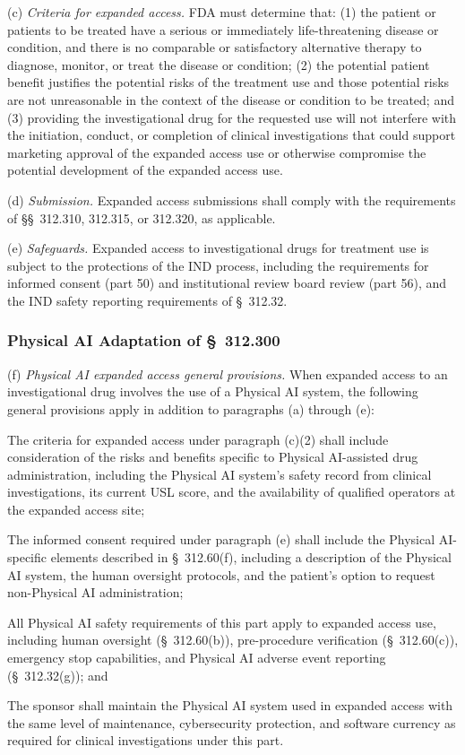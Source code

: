 (c) \textit{Criteria for expanded access.} FDA must determine that: (1) the patient or patients to be treated have a serious or immediately life-threatening disease or condition, and there is no comparable or satisfactory alternative therapy to diagnose, monitor, or treat the disease or condition; (2) the potential patient benefit justifies the potential risks of the treatment use and those potential risks are not unreasonable in the context of the disease or condition to be treated; and (3) providing the investigational drug for the requested use will not interfere with the initiation, conduct, or completion of clinical investigations that could support marketing approval of the expanded access use or otherwise compromise the potential development of the expanded access use.

(d) \textit{Submission.} Expanded access submissions shall comply with the requirements of \S\S~312.310, 312.315, or 312.320, as applicable.

(e) \textit{Safeguards.} Expanded access to investigational drugs for treatment use is subject to the protections of the IND process, including the requirements for informed consent (part 50) and institutional review board review (part 56), and the IND safety reporting requirements of \S~312.32.

\subsubsection{Physical AI Adaptation of \S~312.300}

(f) \textit{Physical AI expanded access general provisions.} When expanded access to an investigational drug involves the use of a Physical AI system, the following general provisions apply in addition to paragraphs (a) through (e):

\begin{description}[leftmargin=0.8cm,style=sameline]
\item[(i)] The criteria for expanded access under paragraph (c)(2) shall include consideration of the risks and benefits specific to Physical AI-assisted drug administration, including the Physical AI system's safety record from clinical investigations, its current USL score, and the availability of qualified operators at the expanded access site;
\item[(ii)] The informed consent required under paragraph (e) shall include the Physical AI-specific elements described in \S~312.60(f), including a description of the Physical AI system, the human oversight protocols, and the patient's option to request non-Physical AI administration;
\item[(iii)] All Physical AI safety requirements of this part apply to expanded access use, including human oversight (\S~312.60(b)), pre-procedure verification (\S~312.60(c)), emergency stop capabilities, and Physical AI adverse event reporting (\S~312.32(g)); and
\item[(iv)] The sponsor shall maintain the Physical AI system used in expanded access with the same level of maintenance, cybersecurity protection, and software currency as required for clinical investigations under this part.
\end{description}

